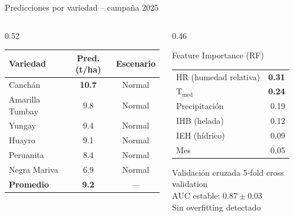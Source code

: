\documentclass[14pt,aspectratio=169]{beamer}
\begin{document}
\begin{frame}{Predicciones por variedad -- campa\~na 2025}
  \begin{columns}[T]
    \begin{column}{0.52\textwidth}
      \begin{center}
      \begin{tabular}{lcc}
        \toprule
        \textbf{Variedad} & \textbf{Pred. (t/ha)} & \textbf{Escenario} \\
        \midrule
        Canch\'an & \textbf{10.7} & Normal \\
        Amarilla Tumbay & 9.8 & Normal \\
        Yungay & 9.4 & Normal \\
        Huayro & 9.1 & Normal \\
        Peruanita & 8.4 & Normal \\
        Negra Mariva & 6.9 & Normal \\
        \midrule
        \rowcolor{agroclear!60}
        \textbf{Promedio} & \textbf{9.2} & --- \\
        \bottomrule
      \end{tabular}
      \end{center}
    \end{column}

    \begin{column}{0.46\textwidth}
      \begin{exampleblock}{Feature Importance (RF)}
        \vspace{0.2em}
        \begin{tabular}{lr}
          HR (humedad relativa) & \textbf{0.31} \\
          T$_{\text{med}}$ & \textbf{0.24} \\
          Precipitaci\'on & 0.19 \\
          IHB (helada) & 0.12 \\
          IEH (h\'idrico) & 0.09 \\
          Mes & 0.05 \\
        \end{tabular}
        \vspace{0.2em}
      \end{exampleblock}
      \vspace{0.3em}
      \begin{block}{Validaci\'on cruzada}
        \footnotesize
        5-fold cross validation\\
        AUC estable: $0.87 \pm 0.03$\\
        Sin overfitting detectado
      \end{block}
    \end{column}
  \end{columns}
\end{frame}
\end{document}
